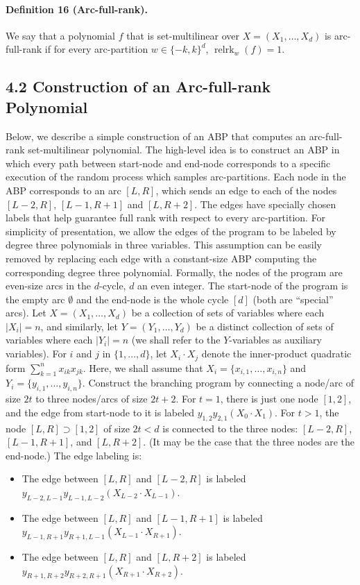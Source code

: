 \paragraph{Definition 16 (Arc-full-rank).} We say that a polynomial $f$ that is set-multilinear over $X=(X_1,\ldots,X_d)$ is arc-full-rank if for every arc-partition $w\in\{-k,k\}^d$, $\operatorname{relrk}_w(f)=1$.
\subsection*{4.2 Construction of an Arc-full-rank Polynomial}
Below, we describe a simple construction of an ABP that computes an arc-full-rank set-multilinear polynomial. The high-level idea is to construct an ABP in which every path between start-node and end-node corresponds to a specific execution of the random process which samples arc-partitions. Each node in the ABP corresponds to an arc $[L,R]$, which sends an edge to each of the nodes $[L-2,R]$, $[L-1,R+1]$ and $[L,R+2]$. The edges have specially chosen labels that help guarantee full rank with respect to every arc-partition. For simplicity of presentation, we allow the edges of the program to be labeled by degree three polynomials in three variables. This assumption can be easily removed by replacing each edge with a constant-size ABP computing the corresponding degree three polynomial.
Formally, the nodes of the program are even-size arcs in the $d$-cycle, $d$ an even integer. The start-node of the program is the empty arc $\emptyset$ and the end-node is the whole cycle $[d]$ (both are ``special'' arcs). Let $X=(X_1,\ldots,X_d)$ be a collection of sets of variables where each $|X_i|=n$, and similarly, let $Y=(Y_1,\ldots,Y_d)$ be a distinct collection of sets of variables where each $|Y_i|=n$ (we shall refer to the $Y$-variables as auxiliary variables). For $i$ and $j$ in $\{1,\ldots,d\}$, let $X_i\cdot X_j$ denote the inner-product quadratic form $\sum_{k=1}^n x_{ik}x_{jk}$. Here, we shall assume that $X_i=\{x_{i,1},\ldots,x_{i,n}\}$ and $Y_i=\{y_{i,1},\ldots,y_{i,n}\}$.
Construct the branching program by connecting a node/arc of size $2t$ to three nodes/arcs of size $2t+2$. For $t=1$, there is just one node $[1,2]$, and the edge from start-node to it is labeled $y_{1,2}y_{2,1}(X_0\cdot X_1)$. For $t>1$, the node $[L,R]\supset[1,2]$ of size $2t<d$ is connected to the three nodes: $[L-2,R]$, $[L-1,R+1]$, and $[L,R+2]$. (It may be the case that the three nodes are the end-node.) The edge labeling is:
\begin{itemize}
\item The edge between $[L,R]$ and $[L-2,R]$ is labeled $y_{L-2,L-1}y_{L-1,L-2}(X_{L-2}\cdot X_{L-1})$.
\item The edge between $[L,R]$ and $[L-1,R+1]$ is labeled $y_{L-1,R+1}y_{R+1,L-1}(X_{L-1}\cdot X_{R+1})$.
\item The edge between $[L,R]$ and $[L,R+2]$ is labeled $y_{R+1,R+2}y_{R+2,R+1}(X_{R+1}\cdot X_{R+2})$.
\end{itemize}
